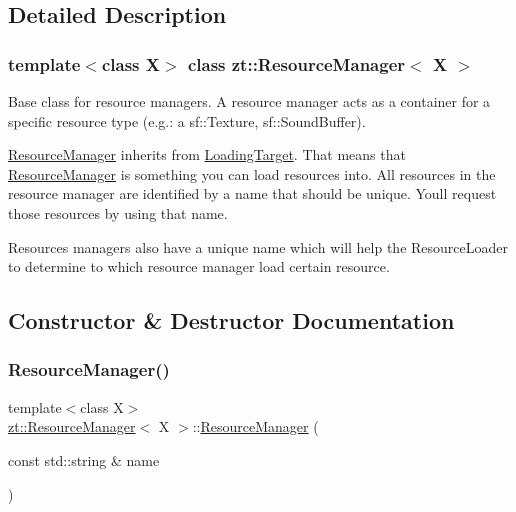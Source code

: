 \subsection{Detailed Description}
\subsubsection*{template$<$class X$>$\newline
class zt\+::\+Resource\+Manager$<$ X $>$}

Base class for resource managers. A resource manager acts as a container for a specific resource type (e.\+g.\+: a sf\+::\+Texture, sf\+::\+Sound\+Buffer). 

\hyperlink{classzt_1_1_resource_manager}{Resource\+Manager} inherits from \hyperlink{classzt_1_1_loading_target}{Loading\+Target}. That means that \hyperlink{classzt_1_1_resource_manager}{Resource\+Manager} is something you can load resources into. All resources in the resource manager are identified by a name that should be unique. You\textquotesingle{}ll request those resources by using that name.

Resources managers also have a unique name which will help the Resource\+Loader to determine to which resource manager load certain resource. 

\subsection{Constructor \& Destructor Documentation}
\mbox{\label{classzt_1_1_resource_manager_aa0973ae6bf2db29a560064101f7e3aa2}} 
\subsubsection{\texorpdfstring{Resource\+Manager()}{ResourceManager()}}
{\footnotesize\ttfamily template$<$class X$>$ \\
\hyperlink{classzt_1_1_resource_manager}{zt\+::\+Resource\+Manager}$<$ X $>$\+::\hyperlink{classzt_1_1_resource_manager}{Resource\+Manager} (\begin{DoxyParamCaption}\item[{const std\+::string \&}]{name }\end{DoxyParamCaption})\hspace{0.3cm}{\ttfamily [inline]}}

